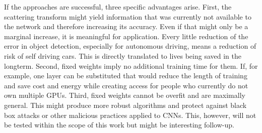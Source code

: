 If the approaches are successful, three specific advantages arise. First, the scattering transform might yield information that was currently not available to the network and therefore increasing its accuracy. Even if that might only be a marginal increase, it is meaningful for application. Every little reduction of the error in object detection, especially for autonomous driving, means a reduction of risk of self driving cars. This is directly translated to lives being saved in the longterm. 
Second, fixed weights imply no additional training time for them. If, for example, one layer can be substituted that would reduce the length of training and save cost and energy while creating access for people who currently do not own multiple GPUs.
Third, fixed weights cannot be overfit and are maximally general. This might produce more robust algorithms and protect against black box attacks or other malicious practices applied to CNNs. This, however, will not be tested within the scope of this work but might be interesting follow-up.
